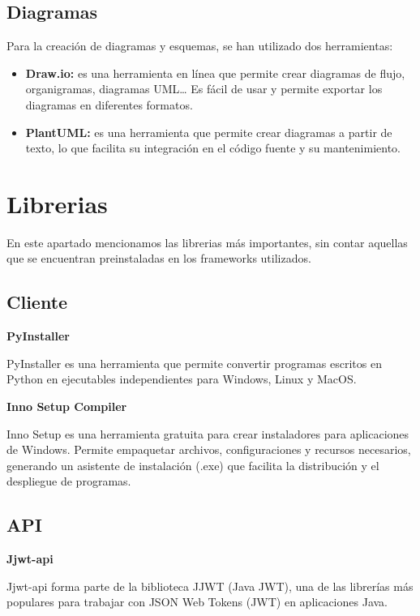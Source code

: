 \subsection{Diagramas}\label{subsec:diagramas}

Para la creación de diagramas y esquemas, se han utilizado dos herramientas:
\begin{itemize}
    \item \textbf{Draw.io:} es una herramienta en línea que permite crear diagramas de flujo, organigramas,
    diagramas UML\ldots
    Es fácil de usar y permite exportar los diagramas en diferentes formatos.
    \item \textbf{PlantUML:} es una herramienta que permite crear diagramas a partir de texto, lo que facilita
    su integración en el código fuente y su mantenimiento.
\end{itemize}

\section{Librerias}\label{sec:librerias}

En este apartado mencionamos las librerias más importantes, sin contar aquellas que se encuentran preinstaladas en los
frameworks utilizados.

\subsection{Cliente}\label{subsec:librerias_cliente}

\textbf{PyInstaller}

PyInstaller\cite{pyinstaller:official} es una herramienta que permite convertir programas escritos en Python en ejecutables independientes para
Windows, Linux y MacOS.


\textbf{Inno Setup Compiler}

Inno Setup\cite{innosetup:official} es una herramienta gratuita para crear instaladores para aplicaciones de Windows.
Permite empaquetar archivos, configuraciones y recursos necesarios, generando un asistente de instalación (.exe) que
facilita la distribución y el despliegue de programas.

\subsection{API}\label{subsec:librerias_api}


\textbf{Jjwt-api}

Jjwt-api forma parte de la biblioteca JJWT (Java JWT)\cite{jjwt:official}, una de las librerías más populares para trabajar con
JSON Web Tokens (JWT) en aplicaciones Java.



